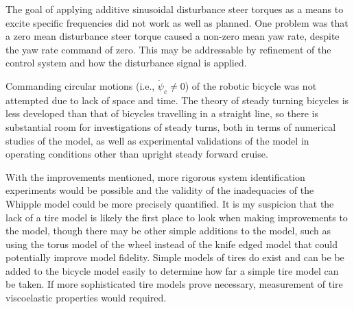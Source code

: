 The goal of applying additive sinusoidal disturbance steer torques as a means
to excite specific frequencies did not work as well as planned. One problem was
that a zero mean disturbance steer torque caused a non-zero mean yaw rate,
despite the yaw rate command of zero. This may be addressable by refinement of
the control system and how the disturbance signal is applied.

Commanding circular motions (i.e., $\dot{\psi}_c \ne 0$) of the robotic bicycle
was not attempted due to lack of space and time. The theory of steady turning
bicycles is less developed than that of bicycles travelling in a straight line,
so there is substantial room for investigations of steady turns, both in terms
of numerical studies of the model, as well as experimental validations of the
model in operating conditions other than upright steady forward cruise.

With the improvements mentioned, more rigorous system identification
experiments would be possible and the validity of the inadequacies of the
Whipple model could be more precisely quantified. It is my suspicion that the
lack of a tire model is likely the first place to look when making improvements
to the model, though there may be other simple additions to the model, such as
using the torus model of the wheel instead of the knife edged model that could
potentially improve model fidelity. Simple models of tires do exist and can be
be added to the bicycle model easily to determine how far a simple tire model
can be taken. If more sophisticated tire models prove necessary, measurement of
tire viscoelastic properties would required.

